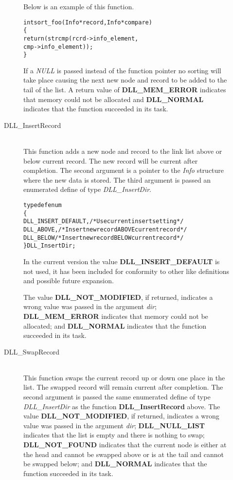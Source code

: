 \documentclass[10pt,letterpaper,titlepage]{article}
\begin{document}
\begin{description}
\begin{description}
 Below is an example of this function.

 \begin{alltt}
   int sort_foo(Info *record, Info *compare)
      \{
      return(strcmp(rcrd->info_element,
                    cmp->info_element));
      \}

 \end{alltt}
 
 If a \emph{NULL} is passed instead of the function pointer no sorting will take place causing the next new node and record to be added to the tail of the list.  A return value of \textbf{DLL\_MEM\_ERROR} indicates that memory could not be allocated and \textbf{DLL\_NORMAL} indicates that the function succeeded in its task.

 \item[DLL\_InsertRecord]\quad\\
 This function adds a new node and record to the link list above or below current record.  The new record will be current after completion.  The second argument is a pointer to the \emph{Info} structure where the new data is stored.  The third argument is passed an enumerated define of type \emph{DLL\_InsertDir}.  

 \small
 \begin{alltt}
typedef enum
   \{
   DLL_INSERT_DEFAULT, /* Use current insert setting */
   DLL_ABOVE,     /* Insert new record ABOVE current record */
   DLL_BELOW      /* Insert new record BELOW current record */ 
   \} DLL_InsertDir;
 \end{alltt}
 \normalsize

 In the current version the value \textbf{DLL\_INSERT\_DEFAULT} is not used, it has been included for conformity to other like definitions and possible future expansion.
\vspace{8pt}

\noindent
 The value \textbf{DLL\_NOT\_MODIFIED}, if returned, indicates a wrong value was passed in the argument \emph{dir}; \textbf{DLL\_MEM\_ERROR} indicates that memory could not be allocated; and \textbf{DLL\_NORMAL} indicates that the function succeeded in its task.

 \item[DLL\_SwapRecord]\quad\\
 This function swaps the current record up or down one place in the list.  The swapped record will remain current after completion.  The second argument is passed the same enumerated define of type \emph{DLL\_InsertDir} as the function \textbf{DLL\_InsertRecord} above.  The value \textbf{DLL\_NOT\_MODIFIED}, if returned, indicates a wrong value was passed in the argument \emph{dir}; \textbf{DLL\_NULL\_LIST} indicates that the list is empty and there is nothing to swap; \textbf{DLL\_NOT\_FOUND} indicates that the current node is either at the head and cannot be swapped above or is at the tail and cannot be swapped below; and \textbf{DLL\_NORMAL} indicates that the function succeeded in its task.


\end{description}
\end{description}
\end{document}
